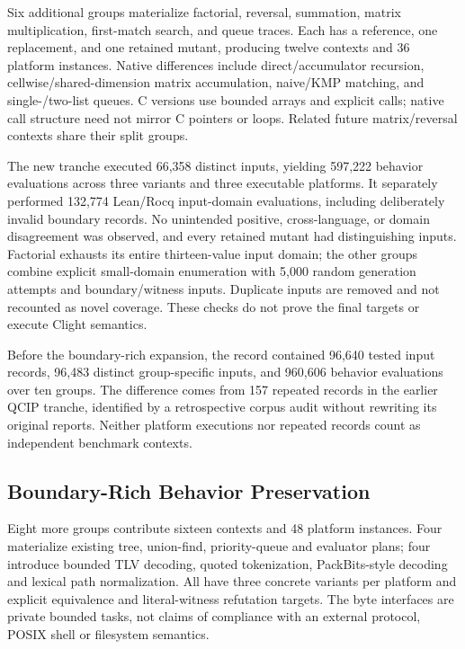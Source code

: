 \documentclass{article}
\begin{document}
Six additional groups materialize factorial, reversal, summation, matrix multiplication, first-match search, and queue traces. Each has a reference, one replacement, and one retained mutant, producing twelve contexts and 36 platform instances. Native differences include direct/accumulator recursion, cellwise/shared-dimension matrix accumulation, naive/KMP matching, and single-/two-list queues. C versions use bounded arrays and explicit calls; native call structure need not mirror C pointers or loops. Related future matrix/reversal contexts share their split groups.

The new tranche executed 66,358 distinct inputs, yielding 597,222 behavior evaluations across three variants and three executable platforms. It separately performed 132,774 Lean/Rocq input-domain evaluations, including deliberately invalid boundary records. No unintended positive, cross-language, or domain disagreement was observed, and every retained mutant had distinguishing inputs. Factorial exhausts its entire thirteen-value input domain; the other groups combine explicit small-domain enumeration with 5,000 random generation attempts and boundary/witness inputs. Duplicate inputs are removed and not recounted as novel coverage. These checks do not prove the final targets or execute Clight semantics.

Before the boundary-rich expansion, the record contained 96,640 tested input records, 96,483 distinct group-specific inputs, and 960,606 behavior evaluations over ten groups. The difference comes from 157 repeated records in the earlier QCIP tranche, identified by a retrospective corpus audit without rewriting its original reports. Neither platform executions nor repeated records count as independent benchmark contexts.

\subsection{Boundary-Rich Behavior Preservation}
\label{sec:boundaries}

Eight more groups contribute sixteen contexts and 48 platform instances. Four materialize existing tree, union-find, priority-queue and evaluator plans; four introduce bounded TLV decoding, quoted tokenization, PackBits-style decoding and lexical path normalization. All have three concrete variants per platform and explicit equivalence and literal-witness refutation targets. The byte interfaces are private bounded tasks, not claims of compliance with an external protocol, POSIX shell or filesystem semantics.
\end{document}
